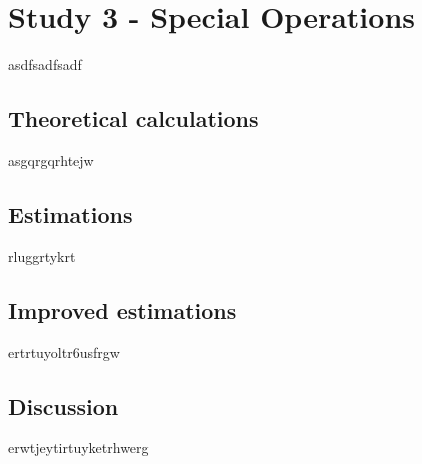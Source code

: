 \section{Study 3 - Special Operations}
asdfsadfsadf
\subsection{Theoretical calculations}
asgqrgqrhtejw
\subsection{Estimations}
rluggrtykrt
\subsection{Improved estimations}
ertrtuyoltr6usfrgw
\subsection{Discussion}
erwtjeytirtuyketrhwerg
